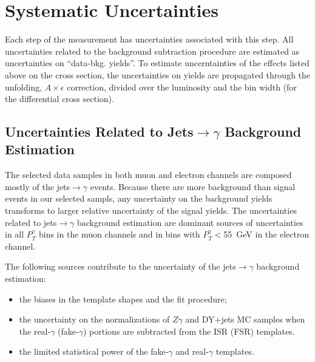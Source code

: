 \section{Systematic Uncertainties}
\label{sec:Systematics}

Each step of the measurement has uncertainties associated with this step. All uncertainties related to the background subtraction procedure are estimated as uncertainties on ``data-bkg. yields''. To estimate uncerntainties of the effects listed above on the cross section, the uncertainties on yields are propagated through the unfolding, $A \times \epsilon$ correction, divided over the luminosity and the bin width (for the differential cross section).

\subsection{Uncertainties Related to Jets$\rightarrow\gamma$ Background Estimation}

The selected data samples in both muon and electron channels are composed mostly of the jets$\rightarrow\gamma$ events. Because there are more background than signal events in our selected sampls, any uncertainty on the background yields transforms to larger relative uncertainty of the signal yields. The uncertainties related to jets$\rightarrow\gamma$ background estimation are dominant sources of uncertainties in all $P_T^{\gamma}$ bins in the muon channels and in bins with $P_T^{\gamma}<$55~GeV in the electron channel.

The following sources contribute to the uncertainty of  the jets$\rightarrow\gamma$ background estimation:
\begin{itemize}
  \item the biases in the template shapes and the fit procedure;
  \item the uncertainty on the normalizations of $Z\gamma$ and DY+jets MC samples when the real-$\gamma$ (fake-$\gamma$) portions are subtracted from the ISR (FSR) templates. 
  \item the limited statistical power of the fake-$\gamma$ and real-$\gamma$ templates.
\end{itemize}

